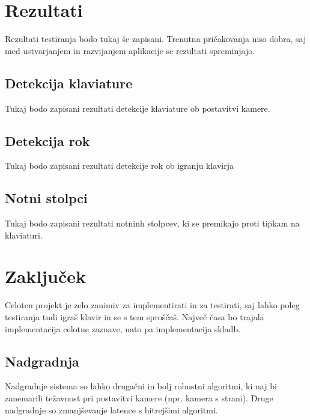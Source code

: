 \documentclass[a4paper,12pt,openright]{book}
\begin{document}
\chapter{Rezultati}
\label{ch3}
Rezultati testiranja bodo tukaj še zapisani. Trenutna pričakovanja niso dobra, saj med ustvarjanjem in razvijanjem aplikacije se rezultati spreminjajo. 
\section{Detekcija klaviature}
Tukaj bodo zapisani rezultati detekcije klaviature ob postavitvi kamere.
\section{Detekcija rok}
Tukaj bodo zapisani rezultati detekcije rok ob igranju klavirja
\section{Notni stolpci}
Tukaj bodo zapisani rezultati notninh stolpcev, ki se premikajo proti tipkam na klaviaturi.

\chapter{Zaključek}
\label{zaklj}
Celoten projekt je zelo zanimiv za implementirati in za testirati, saj lahko poleg testiranja tudi igraš klavir in se s tem sproščaš. Največ časa bo trajala implementacija celotne zaznave, nato pa implementacija skladb.
\section{Nadgradnja}
Nadgradnje sistema so lahko drugačni in bolj robustni algoritmi, ki naj bi zanemarili težavnost pri postavitvi kamere (npr. kamera s strani). Druge nadgradnje so zmanjševanje latence s hitrejšimi algoritmi.








\printbibliography[heading=bibintoc,type=article,title={Članki v revijah}]

\printbibliography[heading=bibintoc,type=inproceedings,title={Članki v zbornikih}]

\printbibliography[heading=bibintoc,type=incollection,title={Poglavja v knjigah}]

\printbibliography[heading=bibintoc,title={Celotna literatura}]
\end{document}
